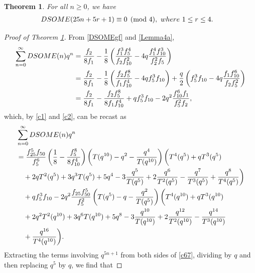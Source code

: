 \documentclass[10pt,a4paper]{amsart}
\newtheorem{theorem}{Theorem}
\begin{document}
\begin{theorem}\label{Theorem1.2}
For all $n\geq0$, we have
\begin{align}
DSOME(25n+5r+1)&\equiv0\pmod{4}, ~where~  1\leq r\leq4.\notag
\end{align}
\end{theorem} 

\begin{proof}[Proof of Theorem \ref{Theorem1.2}] From  \eqref{DSOMEgf} and \eqref{Lemma4a}, 
 \begin{align*}
\sum_{n=0}^{\infty}DSOME(n)q^n
&=\frac{f_2}{8f_1}-\frac{1}{8}\left(\frac{f_1^3f_5^4}{f_2f_{10}^2}-4q\frac{f_1^4f_{10}^3}{f_2^2f_5}\right)\notag\\
&=\frac{f_2}{8f_1}-\frac{1}{8}\left(\frac{f_{2}f_{5}^{8}}{f_{1}f_{10}^{4}}-4qf_{5}^{3}f_{10}\right)+\frac{q}{2}\left(f_{5}^{3}f_{10}-4q\frac{f_{1}f_{10}^{6}}{f_{2}f_{5}^{2}}\right)\notag\\
&=\frac{f_2}{8f_1}-\frac{f_{2}f_{5}^{8}}{8f_{1}f_{10}^{4}}+qf_{5}^{3}f_{10}-2q^2\frac{f_{10}^{6}f_{1}}{f_{5}^{2}f_{2}},\end{align*}
which, by \eqref{c1} and \eqref{c2}, can be recast as
\begin{align}
\label{c67}&\sum_{n=0}^{\infty}DSOME(n)q^n\\
&=\frac{f_{25}^{5}f_{50}}{f_{5}^{6}}\left(\frac{1}{8}-\frac{f_{5}^{8}}{8f_{10}^{4}}\right)\left(T(q^{10})-q^2-\frac{q^4}{T(q^{10})}\right)\bigg(T^4(q^5)+qT^3(q^5)
\notag\\
&\quad+2qT^2(q^5)+3q^3T(q^5)+5q^4-3\frac{q^5}{T(q^5)}+2\frac{q^6}{T^2(q^5)}
-\frac{q^7}{T^3(q^5)}
+\frac{q^8}{T^4(q^5)}\bigg)\notag\\
&\quad+qf_{5}^{3}f_{10}-2q^2\frac{f_{25}f_{50}^{5}}{f_{5}^{2}}\left(T(q^5)-q-\frac{q^2}{T(q^5)}\right)\bigg(T^4(q^{10})+qT^3(q^{10})\notag\\
&\quad+2q^{2}T^2(q^{10})+3q^{6}T(q^{10})+5q^8-3\frac{q^{10}}{T(q^{10})}+
2\frac{q^{12}}{T^2(q^{10})}-\frac{q^{14}}{T^3(q^{10})}\notag\\
&\quad+\frac{q^{16}}{T^4(q^{10})}\bigg).\notag
\end{align}
Extracting the terms involving $q^{5n+1}$ from both sides of \eqref{c67}, dividing by $q$ and then replacing $q^5$ by $q$, we find that


\end{proof}
\end{document}
